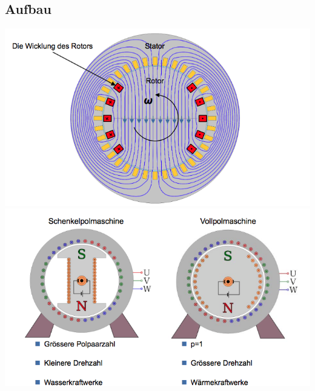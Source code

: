 \subsection{Aufbau}
\begin{minipage}{0.5 \linewidth}
\includegraphics[width = \linewidth]{./Pics/VL910/Aufbau}
\includegraphics[width = \linewidth]{./Pics/VL910/Aufbau3}
\end{minipage}
